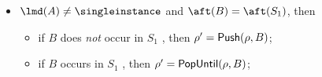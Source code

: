 {\noindent {}
	\begin{itemize}
		\item  $\lmd(A) \neq \singleinstance$ and $\aft(B) = \aft(S_1)$,  then
        	   \begin{itemize}
        		\item if $B$ does \emph{not} occur in $S_1$ ,  then $\rho'= {\sf Push}(\rho,B)$;
        		\item if $B$ occurs in $S_1$ , then $\rho'={\sf PopUntil}(\rho,B)$;
              \end{itemize}	
%
%      	
%		

\end{itemize}}
